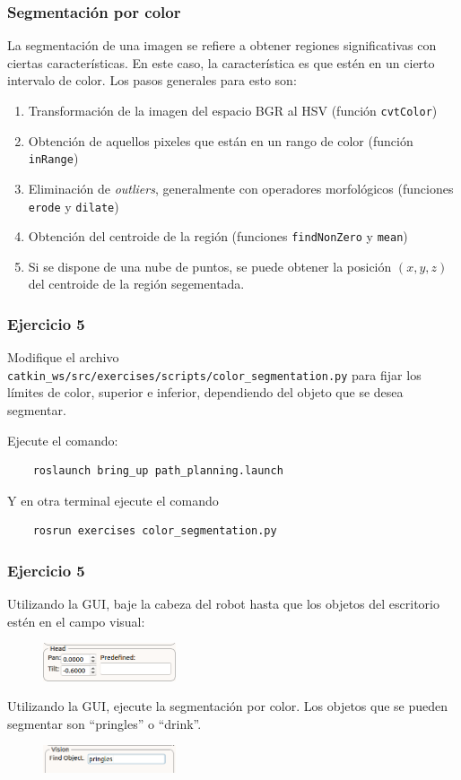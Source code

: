 \begin{frame}\frametitle{Segmentación por color}
  La segmentación de una imagen se refiere a obtener regiones significativas con ciertas características. En este caso, la característica es que estén en un cierto intervalo de color. Los pasos generales para esto son:
  \begin{enumerate}
  \item Transformación de la imagen del espacio BGR al HSV (función \texttt{cvtColor})
  \item Obtención de aquellos pixeles que están en un rango de color (función \texttt{inRange})
  \item Eliminación de \textit{outliers}, generalmente con operadores morfológicos (funciones \texttt{erode} y \texttt{dilate})
  \item Obtención del centroide de la región (funciones \texttt{findNonZero} y \texttt{mean})
  \item Si se dispone de una nube de puntos, se puede obtener la posición $(x,y,z)$ del centroide de la región segementada. 
  \end{enumerate}
\end{frame}

\begin{frame}[containsverbatim]\frametitle{Ejercicio 5}
  Modifique el archivo \texttt{catkin\_ws/src/exercises/scripts/color\_segmentation.py} para fijar los límites de color, superior e inferior, dependiendo del objeto que se desea segmentar. 
  
  Ejecute el comando:
  \begin{lstlisting}
    roslaunch bring_up path_planning.launch
  \end{lstlisting}
  Y en otra terminal ejecute el comando
  \begin{lstlisting}
    rosrun exercises color_segmentation.py
  \end{lstlisting}
\end{frame}

\begin{frame}\frametitle{Ejercicio 5}
  Utilizando la GUI, baje la cabeza del robot hasta que los objetos del escritorio estén en el campo visual:
  \begin{figure}
    \centering
    \includegraphics[width=0.35\textwidth]{Figures/Exercise5Gui1.png}
  \end{figure}
  Utilizando la GUI, ejecute la segmentación por color. Los objetos que se pueden segmentar son ``pringles'' o ``drink''.
  \begin{figure}
    \centering
    \includegraphics[width=0.35\textwidth]{Figures/Exercise5Gui2.png}
  \end{figure}
\end{frame}
